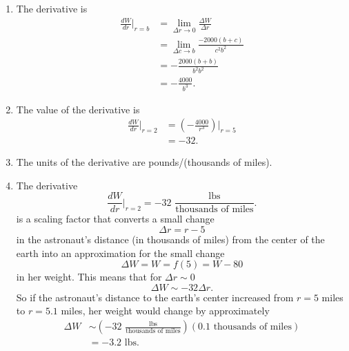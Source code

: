 \documentclass{ximera}
\begin{document}
\begin{question}
\begin{explanation}
\begin{enumerate}
\item The derivative is
\begin{align*}
           \frac{dW}{dr}\Big|_{r=b} &= \lim_{\Delta r\to 0} \frac{\Delta W}{\Delta r}  \\
                                                 &= \lim_{\Delta c\to b} \frac{-2000(b+c)}{c^2 b^2}  \\
                                                 &= -\frac{2000(b+b)}{b^2 b^2} \\
                                                 &= -\frac{4000}{b^3} .
\end{align*}

\item The value of the derivative is
\begin{align*} 
                \frac{dW}{dr}\Big|_{r=2}  &=  \left(-\frac{4000}{r^3}\right) \Big|_{r=5} \\
                                      &= -32 .
\end{align*}

\item The units of the derivative are pounds/(thousands of miles).

\item The derivative
\[
       \frac{dW}{dr}\Big|_{r=2} = -32 \,\,  \frac{\text{lbs}}{\text{thousands of miles}}.
\]
is a scaling factor that converts a small change
\[
 \Delta r = r-5
\]
in the astronaut's distance (in thousands of miles) from the center of the earth into an approximation for the small change
\[
   \Delta W = W = f(5) = W - 80
\]
in her weight. This means that for $\Delta r \sim 0$
\[
   \Delta W \sim -32\Delta r .
\]
So if the astronaut's distance to the earth's center increased from $r=5$ miles to $r=5.1$ miles, her weight would change by approximately
\begin{align*}
  \Delta W  &\sim \left(  -32 \, \, \frac{\text{lbs}}{\text{thousands of miles}} \right) \left( 0.1 \text{ thousands of miles}  \right) \\
                &= -3.2 \text{ lbs} .
\end{align*}

\end{enumerate}
\end{explanation}
\end{question}
\end{document}
